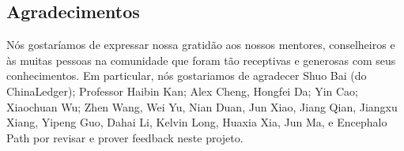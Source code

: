 \documentclass[UTF8,nofonts]{article}
\begin{document}
\begin{multicols}{2}
\section{Agradecimentos}
Nós gostaríamos de expressar nossa gratidão aos nossos mentores, conselheiros e às muitas pessoas na comunidade que foram tão receptivas e generosas com seus conhecimentos. Em particular, nós gostariamos de agradecer Shuo Bai (do ChinaLedger); Professor Haibin Kan; Alex Cheng, Hongfei Da; Yin Cao; Xiaochuan Wu; Zhen Wang, Wei Yu, Nian Duan, Jun Xiao, Jiang Qian, Jiangxu Xiang, Yipeng Guo, Dahai Li, Kelvin Long, Huaxia Xia, Jun Ma, e Encephalo Path por revisar e prover feedback neste projeto.



\end{multicols}
\end{document}
